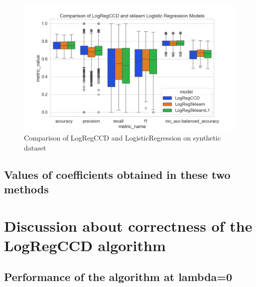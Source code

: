 \documentclass[12pt]{article}
\begin{document}
\begin{figure}[h]
    \centering
  \includegraphics[width=\textwidth]{../results/comparison-synthetic-dataset.png}
    \caption{Comparison of LogRegCCD and LogisticRegression on synthetic dataset}
    \label{fig:comparison-synthetic-dataset}
  \end{figure}

\subsection{Values of coefficients obtained in these two methods}

\section{Discussion about correctness of the LogRegCCD algorithm}

\subsection{Performance of the algorithm at lambda=0}
\end{document}
